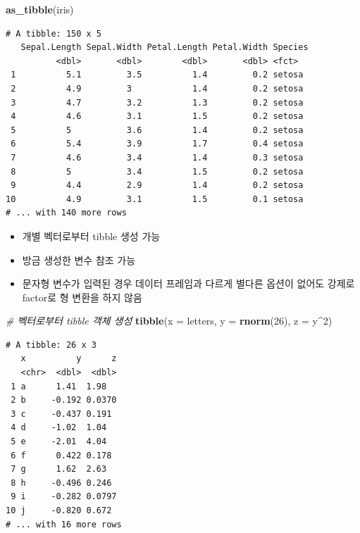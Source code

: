 \documentclass[
  11pt,
]{krantz}
\newenvironment{Shaded}{\begin{snugshade}}{\end{snugshade}}
\newcommand{\CommentTok}[1]{\textcolor[rgb]{0.37,0.37,0.37}{\textit{#1}}}
\newcommand{\DataTypeTok}[1]{\textcolor[rgb]{0.27,0.27,0.27}{#1}}
\newcommand{\DecValTok}[1]{\textcolor[rgb]{0.06,0.06,0.06}{#1}}
\newcommand{\KeywordTok}[1]{\textcolor[rgb]{0.27,0.27,0.27}{\textbf{#1}}}
\newcommand{\NormalTok}[1]{#1}
\newcommand{\OperatorTok}[1]{\textcolor[rgb]{0.43,0.43,0.43}{\textbf{#1}}}
\providecommand{\tightlist}{%
  \setlength{\itemsep}{0pt}\setlength{\parskip}{0pt}}
\begin{document}
\begin{Shaded}
\begin{Highlighting}[]
\KeywordTok{as_tibble}\NormalTok{(iris)}
\end{Highlighting}
\end{Shaded}

\begin{verbatim}
# A tibble: 150 x 5
   Sepal.Length Sepal.Width Petal.Length Petal.Width Species
          <dbl>       <dbl>        <dbl>       <dbl> <fct>  
 1          5.1         3.5          1.4         0.2 setosa 
 2          4.9         3            1.4         0.2 setosa 
 3          4.7         3.2          1.3         0.2 setosa 
 4          4.6         3.1          1.5         0.2 setosa 
 5          5           3.6          1.4         0.2 setosa 
 6          5.4         3.9          1.7         0.4 setosa 
 7          4.6         3.4          1.4         0.3 setosa 
 8          5           3.4          1.5         0.2 setosa 
 9          4.4         2.9          1.4         0.2 setosa 
10          4.9         3.1          1.5         0.1 setosa 
# ... with 140 more rows
\end{verbatim}

\normalsize

\begin{itemize}
\tightlist
\item
  개별 벡터로부터 tibble 생성 가능
\item
  방금 생성한 변수 참조 가능
\item
  문자형 변수가 입력된 경우 데이터 프레임과 다르게 별다른 옵션이 없어도 강제로 factor로 형 변환을 하지 않음
\end{itemize}

\footnotesize

\begin{Shaded}
\begin{Highlighting}[]
\CommentTok{# 벡터로부터 tibble 객체 생성}
\KeywordTok{tibble}\NormalTok{(}\DataTypeTok{x =}\NormalTok{ letters, }\DataTypeTok{y =} \KeywordTok{rnorm}\NormalTok{(}\DecValTok{26}\NormalTok{), }\DataTypeTok{z =}\NormalTok{ y}\OperatorTok{^}\DecValTok{2}\NormalTok{)}
\end{Highlighting}
\end{Shaded}

\begin{verbatim}
# A tibble: 26 x 3
   x          y      z
   <chr>  <dbl>  <dbl>
 1 a      1.41  1.98  
 2 b     -0.192 0.0370
 3 c     -0.437 0.191 
 4 d     -1.02  1.04  
 5 e     -2.01  4.04  
 6 f      0.422 0.178 
 7 g      1.62  2.63  
 8 h     -0.496 0.246 
 9 i     -0.282 0.0797
10 j     -0.820 0.672 
# ... with 16 more rows
\end{verbatim}
\end{document}

